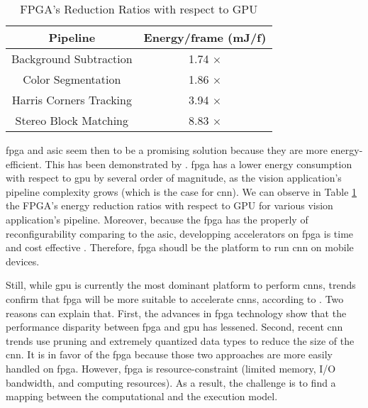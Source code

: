 \begin{table}
    \center
    \begin{tabular}{|c|c|}
        \hline
        Pipeline & Energy/frame (mJ/f) \\
        \hline
        Background Subtraction & 1.74 $\times$\\
        \hline
        Color Segmentation & 1.86 $\times$ \\
        \hline
        Harris Corners Tracking & 3.94 $\times$ \\
        \hline
        Stereo Block Matching & 8.83 $\times$ \\
        \hline
    \end{tabular}
    \caption{FPGA’s Reduction Ratios with respect to GPU \cite{qasaimeh_comparing_2019}}
    \label{tab:benchener}
\end{table}
%
\acrshort{fpga} and \acrshort{asic} seem then to be a promising solution because they are more energy-efficient. This has been demonstrated by \textcite{qasaimeh_comparing_2019}. \acrshort{fpga} has a lower energy consumption with respect to \acrshort{gpu} by several order of magnitude, as the vision application’s pipeline complexity grows (which is the case for \acrshort{cnn}). We can observe in Table \ref{tab:benchener} the FPGA’s energy reduction ratios with respect to GPU for various vision application’s pipeline. Moreover, because the \acrshort{fpga} has the properly of reconfigurability comparing to the \acrshort{asic}, developping accelerators on \acrshort{fpga} is time and cost effective \cite{motamedi_placid_2017}. Therefore, \acrshort{fpga} shoudl be the platform to run \acrshort{cnn} on mobile devices.

Still, while \acrshort{gpu} is currently the most dominant platform to perform \acrshort{cnn}s, trends confirm that \acrshort{fpga} will be more suitable to accelerate \acrshort{cnn}s, according to \textcite{nurvitadhi_can_2017}. Two reasons can explain that. First, the advances in \acrshort{fpga} technology show that the performance disparity between \acrshort{fpga} and \acrshort{gpu} has lessened. Second, recent \acrshort{cnn} trends use pruning and extremely quantized data types to reduce the size of the \acrshort{cnn}. It is in favor of the \acrshort{fpga} because those two approaches are more easily handled on \acrshort{fpga}. However, \acrshort{fpga} is resource-constraint (limited memory, I/O bandwidth, and computing resources). As a result, the challenge is to find a mapping between the computational and the execution model.

